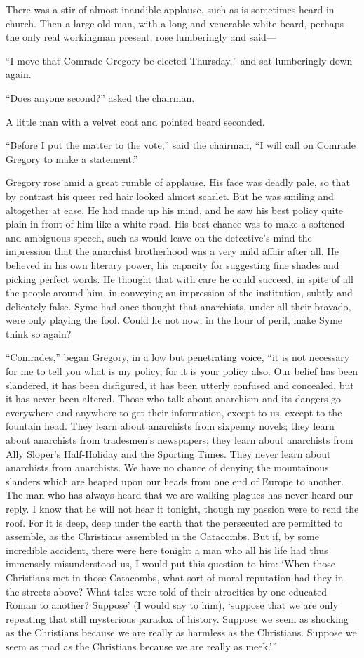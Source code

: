 There was a stir of almost inaudible applause, such as is sometimes heard in church. Then a large old man, with a long and venerable white beard, perhaps the only real workingman present, rose lumberingly and said⁠—

“I move that Comrade Gregory be elected Thursday,” and sat lumberingly down again.

“Does anyone second?” asked the chairman.

A little man with a velvet coat and pointed beard seconded.

“Before I put the matter to the vote,” said the chairman, “I will call on Comrade Gregory to make a statement.”

Gregory rose amid a great rumble of applause. His face was deadly pale, so that by contrast his queer red hair looked almost scarlet. But he was smiling and altogether at ease. He had made up his mind, and he saw his best policy quite plain in front of him like a white road. His best chance was to make a softened and ambiguous speech, such as would leave on the detective’s mind the impression that the anarchist brotherhood was a very mild affair after all. He believed in his own literary power, his capacity for suggesting fine shades and picking perfect words. He thought that with care he could succeed, in spite of all the people around him, in conveying an impression of the institution, subtly and delicately false. Syme had once thought that anarchists, under all their bravado, were only playing the fool. Could he not now, in the hour of peril, make Syme think so again?

“Comrades,” began Gregory, in a low but penetrating voice, “it is not necessary for me to tell you what is my policy, for it is your policy also. Our belief has been slandered, it has been disfigured, it has been utterly confused and concealed, but it has never been altered. Those who talk about anarchism and its dangers go everywhere and anywhere to get their information, except to us, except to the fountain head. They learn about anarchists from sixpenny novels; they learn about anarchists from tradesmen’s newspapers; they learn about anarchists from Ally Sloper’s Half-Holiday and the Sporting Times. They never learn about anarchists from anarchists. We have no chance of denying the mountainous slanders which are heaped upon our heads from one end of Europe to another. The man who has always heard that we are walking plagues has never heard our reply. I know that he will not hear it tonight, though my passion were to rend the roof. For it is deep, deep under the earth that the persecuted are permitted to assemble, as the Christians assembled in the Catacombs. But if, by some incredible accident, there were here tonight a man who all his life had thus immensely misunderstood us, I would put this question to him: ‘When those Christians met in those Catacombs, what sort of moral reputation had they in the streets above? What tales were told of their atrocities by one educated Roman to another? Suppose’ (I would say to him), ‘suppose that we are only repeating that still mysterious paradox of history. Suppose we seem as shocking as the Christians because we are really as harmless as the Christians. Suppose we seem as mad as the Christians because we are really as meek.’ ”

